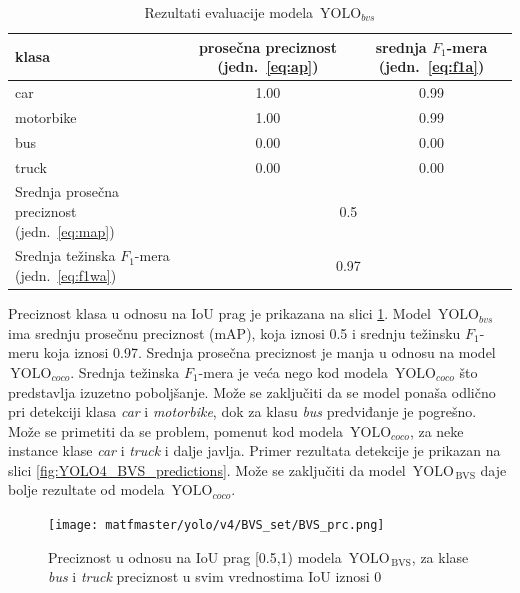 \documentclass[12pt,oneside]{memoir}
\newcommand{\yolo}{\ensuremath{\,\textrm{YOLO}}}
\newcommand{\bvs}{\ensuremath{\,\textrm{BVS}}}
\begin{document}
\begin{table}
    \begin{center}
    \caption{Rezultati evaluacije modela $\yolo_{bvs}$}
        \begin{tabular}{|m{10em}|c|c|}
        \toprule
        klasa     & prosečna preciznost (jedn.~\ref{eq:ap}) & srednja $F_1$-mera (jedn.~\ref{eq:f1a})  \\ \hline
        \midrule
        car       & 1.00  & 0.99 \\ \hline
        motorbike & 1.00  & 0.99 \\ \hline
        bus       & 0.00  & 0.00 \\ \hline
        truck     & 0.00  & 0.00 \\ \hline
        \bottomrule
        Srednja prosečna preciznost (jedn.~\ref{eq:map}) & \multicolumn{2}{c|}{0.5}  \\ \hline
        Srednja težinska $F_1$-mera (jedn.~\ref{eq:f1wa}) & \multicolumn{2}{c|}{0.97}  \\ \hline
    \end{tabular}
    \label{tab:YOLO4_BVS_results}
    \end{center}
\end{table}

Preciznost klasa u odnosu na IoU prag je prikazana na slici \ref{fig:YOLO4_BVS_prc}. Model $\yolo_{bvs}$ ima srednju prosečnu preciznost (mAP), koja iznosi 0.5 i srednju težinsku $F_1$-meru koja iznosi 0.97. 
Srednja prosečna preciznost je manja u odnosu na model $\yolo_{coco}$. Srednja težinska $F_1$-mera je veća nego kod modela $\yolo_{coco}$ što predstavlja izuzetno poboljšanje. Može se zaključiti da se model ponaša odlično pri detekciji klasa \textit{car} i \textit{motorbike}, dok za klasu \textit{bus} predviđanje je pogrešno. Može se primetiti da se problem, pomenut kod modela $\yolo_{coco}$, za neke instance klase \textit{car} i \textit{truck} i dalje javlja. Primer rezultata detekcije je prikazan na slici \ref{fig:YOLO4_BVS_predictions}. Može se zaključiti da model $\yolo_{\bvs}$ daje bolje rezultate od modela $\yolo_{coco}$.



\begin{figure}[!ht]
    \centering
    \texttt{[image: matfmaster/yolo/v4/BVS\_set/BVS\_prc.png]}
    \caption{Preciznost u odnosu na IoU prag [0.5,1) modela $\yolo_{\bvs}$, za klase \textit{bus} i \textit{truck} preciznost u svim vrednostima IoU iznosi 0}
    \label{fig:YOLO4_BVS_prc}
\end{figure}
\end{document}
